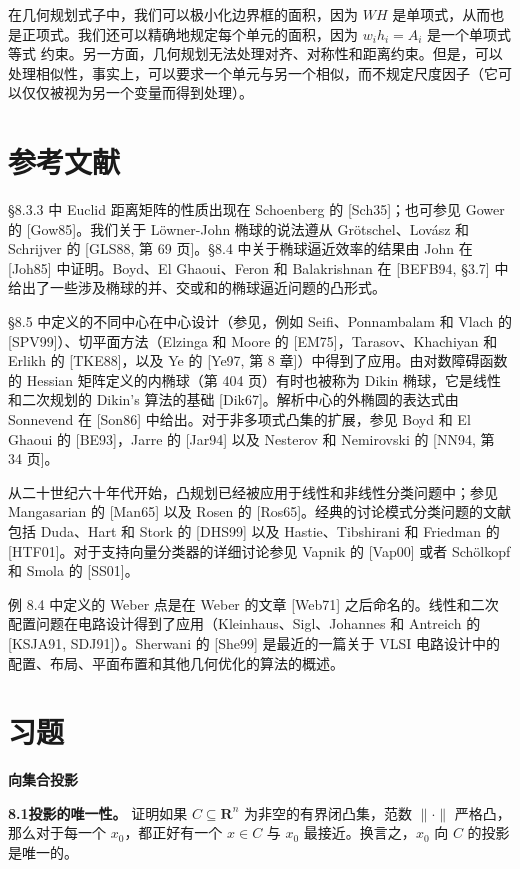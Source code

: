 \documentclass[UTF8,12pt,a4paper,fontset=fandol]{ctexart}
\begin{document}
在几何规划式子中，我们可以极小化边界框的面积，因为 $WH$ 是单项式，从而也是正项式。我们还可以精确地规定每个单元的面积，因为 $w_ih_i=A_i$ 是一个单项式等式
约束。另一方面，几何规划无法处理对齐、对称性和距离约束。但是，可以处理相似性，事实上，可以要求一个单元与另一个相似，而不规定尺度因子（它可以仅仅被视为另一个变量而得到处理）。

\section*{参考文献}

\S 8.3.3 中 Euclid 距离矩阵的性质出现在 Schoenberg 的 [Sch35]；也可参见 Gower 的 [Gow85]。我们关于 Löwner-John 椭球的说法遵从 Grötschel、Lovász 和 Schrijver 的 [GLS88, 第 69 页]。\S 8.4 中关于椭球逼近效率的结果由 John 在 [Joh85] 中证明。Boyd、El Ghaoui、Feron 和 Balakrishnan 在 [BEFB94, \S 3.7] 中给出了一些涉及椭球的并、交或和的椭球逼近问题的凸形式。

\S 8.5 中定义的不同中心在中心设计（参见，例如 Seifi、Ponnambalam 和 Vlach 的 [SPV99]）、切平面方法（Elzinga 和 Moore 的 [EM75]，Tarasov、Khachiyan 和 Erlikh 的 [TKE88]，以及 Ye 的 [Ye97, 第 8 章]）中得到了应用。由对数障碍函数的 Hessian 矩阵定义的内椭球（第 404 页）有时也被称为 Dikin 椭球，它是线性和二次规划的 Dikin's 算法的基础 [Dik67]。解析中心的外椭圆的表达式由 Sonnevend 在 [Son86] 中给出。对于非多项式凸集的扩展，参见 Boyd 和 El Ghaoui 的 [BE93]，Jarre 的 [Jar94] 以及 Nesterov 和 Nemirovski 的 [NN94, 第 34 页]。

从二十世纪六十年代开始，凸规划已经被应用于线性和非线性分类问题中；参见 Mangasarian 的 [Man65] 以及 Rosen 的 [Ros65]。经典的讨论模式分类问题的文献包括 Duda、Hart 和 Stork
的 [DHS99] 以及 Hastie、Tibshirani 和 Friedman 的 [HTF01]。对于支持向量分类器的详细讨论参见 Vapnik 的 [Vap00] 或者 Schölkopf 和 Smola 的 [SS01]。

例 8.4 中定义的 Weber 点是在 Weber 的文章 [Web71] 之后命名的。线性和二次配置问题在电路设计得到了应用（Kleinhaus、Sigl、Johannes 和 Antreich 的 [KSJA91, SDJ91]）。Sherwani 的 [She99] 是最近的一篇关于 VLSI 电路设计中的配置、布局、平面布置和其他几何优化的算法的概述。

\section*{习题}

\noindent\textbf{向集合投影}

\noindent\textbf{8.1\quad 投影的唯一性。}
证明如果 $C\subseteq\mathbf{R}^n$ 为非空的有界闭凸集，范数 $\|\cdot\|$ 严格凸，那么对于每一个 $x_0$，都正好有一个 $x\in C$ 与 $x_0$ 最接近。换言之，$x_0$ 向 $C$ 的投影是唯一的。
\end{document}
